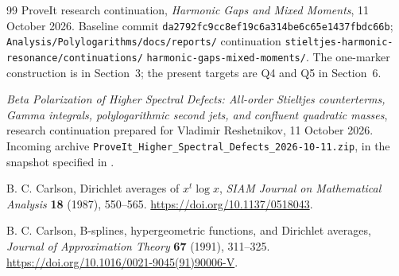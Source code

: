 \documentclass[11pt,a4paper]{article}
\numberwithin{equation}{section}
\theoremstyle{definition}
\theoremstyle{remark}
\begin{document}
\begin{thebibliography}{99}
ProveIt research continuation,
\emph{Harmonic Gaps and Mixed Moments}, 11 October 2026.
Baseline commit \texttt{da2792fc9cc8ef19c6a314be6c65e1437fbdc66b};
\texttt{Analysis/Polylogarithms/docs/reports/} continuation
\texttt{stieltjes-harmonic-resonance/continuations/}
\texttt{harmonic-gaps-mixed-moments/}.
The one-marker construction is in Section~3; the present targets are
Q4 and Q5 in Section~6.

\emph{Beta Polarization of Higher Spectral Defects:
All-order Stieltjes counterterms, Gamma integrals,
polylogarithmic second jets, and confluent quadratic masses},
research continuation prepared for Vladimir Reshetnikov, 11 October 2026.
Incoming archive \texttt{ProveIt\_Higher\_Spectral\_Defects\_2026-10-11.zip},
in the snapshot specified in \cite{RepoMain}.


B. C. Carlson,
Dirichlet averages of $x^t\log x$,
\emph{SIAM Journal on Mathematical Analysis} \textbf{18} (1987), 550--565.
\url{https://doi.org/10.1137/0518043}.


B. C. Carlson,
B-splines, hypergeometric functions, and Dirichlet averages,
\emph{Journal of Approximation Theory} \textbf{67} (1991), 311--325.
\url{https://doi.org/10.1016/0021-9045(91)90006-V}.


\end{thebibliography}
\end{document}
